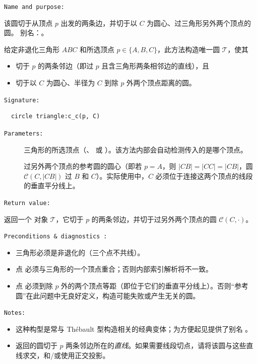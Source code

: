 \medskip
\texttt{Name and purpose: }

该圆切于从顶点 $p$ 出发的两条边，并切于以 $C$ 为圆心、过三角形另外两个顶点的圆。
别名：。

给定非退化三角形 $ABC$ 和所选顶点 $p\in\{A,B,C\}$，此方法构造唯一圆 $\mathcal{T}$，使其
\begin{itemize}
  \item 切于 $p$ 的两条邻边（即过 $p$ 且含三角形两条相邻边的直线），且
  \item 切于以 $C$ 为圆心、半径为 \(C\) 到除 $p$ 外两个顶点距离的圆。
\end{itemize}

\texttt{Signature: }

\begin{verbatim}
  circle triangle:c_c(p, C)
\end{verbatim}

\texttt{Parameters: }

\begin{description}
  \item[] 三角形的所选顶点（、 或 ）。该方法内部会自动检测传入的是哪个顶点。
  \item[] 过另外两个顶点的参考圆的圆心（即若 \(p=A\)，则 \(|CB|=|CC|=|C\!B|\)，圆 \(\mathcal{C}(C,|CB|)\) 过 $B$ 和 $C$）。实际使用中，$C$ 必须位于连接这两个顶点的线段的垂直平分线上。
\end{description}

\texttt{Return value: }

返回一个 对象 $\mathcal{T}$，它切于 \(p\) 的两条邻边，并切于过另外两个顶点的圆 $\mathcal{C}(C,\cdot)$。


\texttt{Preconditions \& diagnostics :}

\begin{itemize}
  \item 三角形必须是非退化的（三个点不共线）。
  \item 点  必须与三角形的一个顶点重合；否则内部索引解析将不一致。
  \item 点  必须到除 \(p\) 外的两个顶点等距（即位于它们的垂直平分线上）。否则“参考圆”在此问题中无良好定义，构造可能失败或产生无关的圆。
\end{itemize}

\texttt{Notes: }

\begin{itemize}
  \item 这种构型是常与 Thébault 型构造相关的经典变体；为方便起见提供了别名 。
  \item 返回的圆切于 \(p\) 两条邻边所在的\emph{直线}。如果需要线段切点，请将该圆与这些直线求交，和/或使用正交投影。
\end{itemize}

